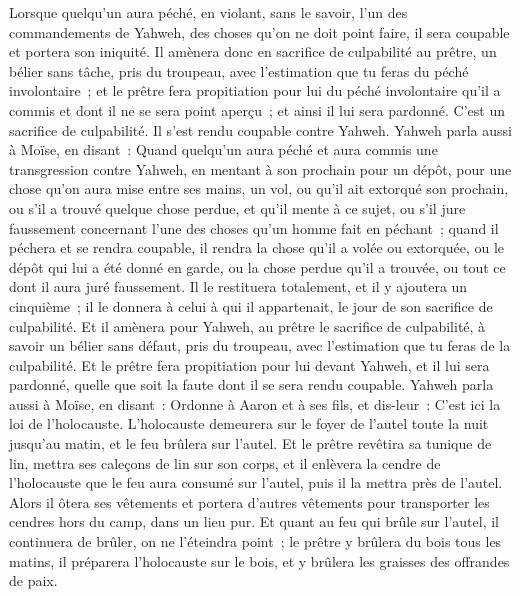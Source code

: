 \begin{multicols}{2}
Lorsque quelqu'un aura péché, en violant, sans le savoir, l'un des commandements de Yahweh, des choses qu'on ne doit point faire, il sera coupable et portera son iniquité.
Il amènera donc en sacrifice de culpabilité au prêtre, un bélier sans tâche, pris du troupeau, avec l'estimation que tu feras du péché involontaire~; et le prêtre fera propitiation pour lui du péché involontaire qu'il a commis et dont il ne se sera point aperçu~; et ainsi il lui sera pardonné.
C'est un sacrifice de culpabilité. Il s'est rendu coupable contre Yahweh.
Yahweh parla aussi à Moïse, en disant~:
Quand quelqu'un aura péché et aura commis une transgression contre Yahweh, en mentant à son prochain pour un dépôt, pour une chose qu'on aura mise entre ses mains, un vol, ou qu'il ait extorqué son prochain,
ou s'il a trouvé quelque chose perdue, et qu'il mente à ce sujet, ou s'il jure faussement concernant l'une des choses qu'un homme fait en péchant~;
quand il péchera et se rendra coupable, il rendra la chose qu'il a volée ou extorquée, ou le dépôt qui lui a été donné en garde, ou la chose perdue qu'il a trouvée,
ou tout ce dont il aura juré faussement. Il le restituera totalement, et il y ajoutera un cinquième~; il le donnera à celui à qui il appartenait, le jour de son sacrifice de culpabilité.
Et il amènera pour Yahweh, au prêtre le sacrifice de culpabilité, à savoir un bélier sans défaut, pris du troupeau, avec l'estimation que tu feras de la culpabilité.
Et le prêtre fera propitiation pour lui devant Yahweh, et il lui sera pardonné, quelle que soit la faute dont il se sera rendu coupable. 
\VerseOne{}Yahweh parla aussi à Moïse, en disant~:
Ordonne à Aaron et à ses fils, et dis-leur~: C'est ici la loi de l'holocauste. L'holocauste demeurera sur le foyer de l'autel toute la nuit jusqu'au matin, et le feu brûlera sur l'autel.
Et le prêtre revêtira sa tunique de lin, mettra ses caleçons de lin sur son corps, et il enlèvera la cendre de l'holocauste que le feu aura consumé sur l'autel, puis il la mettra près de l'autel.
Alors il ôtera ses vêtements et portera d'autres vêtements pour transporter les cendres hors du camp, dans un lieu pur.
Et quant au feu qui brûle sur l'autel, il continuera de brûler, on ne l'éteindra point~; le prêtre y brûlera du bois tous les matins, il préparera l'holocauste sur le bois, et y brûlera les graisses des offrandes de paix.

\end{multicols}
